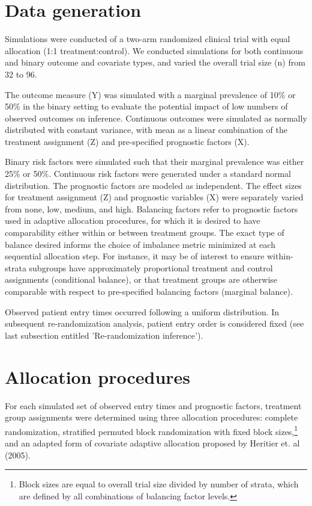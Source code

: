 \section{Data generation}
Simulations were conducted of a two-arm randomized clinical trial with equal allocation (1:1 treatment:control).  
We conducted simulations for both continuous and binary outcome and covariate types, and varied the overall trial size (n) from 32 to 96.

The outcome measure (Y) was simulated with a marginal prevalence of 10\% or 50\% in the binary setting to evaluate the potential impact of low numbers of observed outcomes on inference.  
Continuous outcomes were simulated as normally distributed with constant variance, with mean as a linear combination of the treatment assignment (Z) and pre-specified prognostic factors (X).

Binary risk factors were simulated such that their marginal prevalence was either 25\% or 50\%.  
Continuous risk factors were generated under a standard normal distribution.  
The prognostic factors are modeled as independent.  
The effect sizes for treatment assignment (Z) and prognostic variables (X) were separately varied from none, low, medium, and high.  
Balancing factors refer to prognostic factors used in adaptive allocation procedures, for which it is desired to have comparability either within or between treatment groups.  
The exact type of balance desired informs the choice of imbalance metric minimized at each sequential allocation step.  
For instance, it may be of interest to ensure within-strata subgroups have approximately proportional treatment and control assignments (conditional balance), or that treatment groups are otherwise comparable with respect to pre-specified balancing factors (marginal balance). 

Observed patient entry times occurred following a uniform distribution.  
In subsequent re-randomization analysis, patient entry order is considered fixed (see last subsection entitled 'Re-randomization inference'). 

\section{Allocation procedures}
For each simulated set of observed entry times and prognostic factors, treatment group assignments were determined using three allocation procedures: complete randomization, stratified permuted block randomization with fixed block sizes,\footnote{Block sizes are equal to overall trial size divided by number of strata, which are defined by all combinations of balancing factor levels.} and an adapted form of covariate adaptive allocation proposed by Heritier et. al (2005). 

